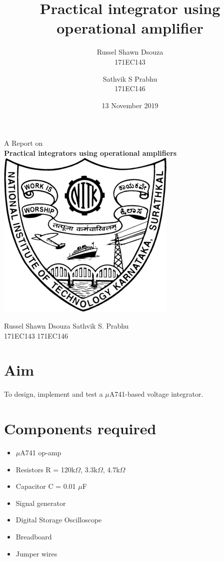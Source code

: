 \documentclass[12pt, titlepage]{article}
\title{\textbf{Practical integrator using operational amplifier}}
\author{
  Russel Shawn Dsouza\\
  171EC143
  \and
  Sathvik S Prabhu\\
  171EC146
}
\date{13 November 2019}
\theoremstyle{definition}
\begin{document}
  \begin{titlepage}
    \begin{center}
      \vspace*{5em}
      \huge{A Report on}\\
      \huge{\textbf{Practical integrators using operational amplifiers}}\\
      \vspace*{2em}
      \includegraphics[scale=0.5]{logo.png}\\
    \end{center}

    \vspace*{2em}
    \hspace*{5em} \large{Russel Shawn Dsouza} \hspace*{5em} \large{Sathvik S. Prabhu}\\
    \hspace*{6em} \large{171EC143} \hspace*{10em} \large{171EC146}
  \end{titlepage}
  \thispagestyle{empty}

  \newpage
  \tableofcontents
  \thispagestyle{empty}

  \newpage
  \setcounter{page}{1}
  \section{Aim}
    To design, implement and test a $\mu$A741-based voltage integrator.


  \section*{Components required}
    \begin{itemize}
      \item $\mu$A741 op-amp
      \item Resistors R = 120k$\Omega$, 3.3k$\Omega$, 4.7k$\Omega$
      \item Capacitor C = 0.01 $\mu$F
      \item Signal generator
      \item Digital Storage Oscilloscope
      \item Breadboard
      \item Jumper wires
    \end{itemize}
\end{document}
